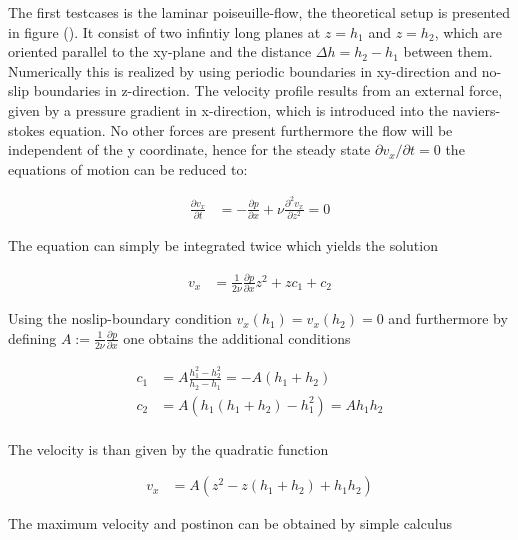 

The first testcases is the laminar poiseuille-flow, the theoretical setup is presented in figure ().
It consist of two infintiy long planes at $z=h_1$ and $z=h_2$, which are oriented parallel to the xy-plane and the distance $\Delta h = h_2 - h_1$ between them.
Numerically this is realized by using periodic boundaries in xy-direction and no-slip boundaries in z-direction.
The velocity profile results from an external force, given by a  pressure gradient in x-direction, which is introduced into the naviers-stokes equation.
No other forces are present furthermore the flow will be independent of the y coordinate,
hence for the steady state $\partial v_x /\partial t = 0$ the equations of motion can be reduced to:

\begin{align}
\frac{\partial v_x}{\partial t} &= - \frac{\partial p}{\partial x} + \nu \frac{\partial^2 v_x}{\partial z^2} = 0
\end{align}

The equation can simply be integrated twice which yields the solution

\begin{align}
v_x &= \frac{1}{2\nu}\frac{\partial p}{\partial x}z^2 + zc_1 + c_2
\end{align}

Using the noslip-boundary condition $v_x(h_1) = v_x(h_2) = 0$ and furthermore by defining
$A:=\frac{1}{2\nu}\frac{\partial p}{\partial x}$ one obtains the additional conditions

\begin{align}
c_1 &= A\frac{h_1^2 -h_2^2}{h_2 - h_1} = -A(h_1+h_2)\\
c_2 &= A(h_1(h_1 + h_2) - h_1^2) = Ah_1h_2\\
\end{align}

The velocity is than given by the quadratic function

\begin{align}
v_x &= A(z^2 - z(h_1 + h_2) + h_1h_2)
\end{align}

The maximum velocity and postinon can be obtained by simple calculus

